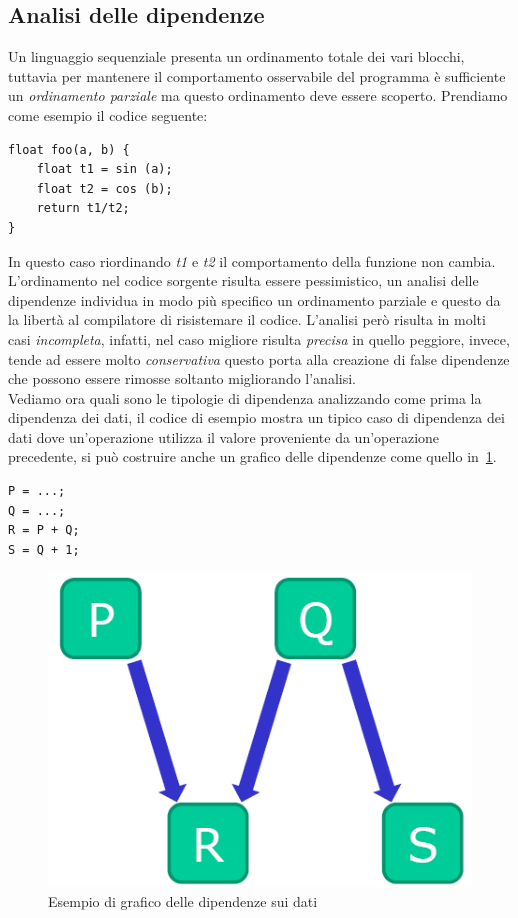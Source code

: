 \subsection{Analisi delle dipendenze}
Un linguaggio sequenziale presenta un ordinamento totale dei vari blocchi, tuttavia per mantenere il comportamento osservabile del programma è sufficiente un \emph{ordinamento parziale} ma questo ordinamento deve essere scoperto. Prendiamo come esempio il codice seguente:
\begin{verbatim}
float foo(a, b) {
    float t1 = sin (a);
    float t2 = cos (b);
    return t1/t2;
}
\end{verbatim}
In questo caso riordinando \emph{t1} e \emph{t2} il comportamento della funzione non cambia. L'ordinamento nel codice sorgente risulta essere pessimistico, un analisi delle dipendenze individua in modo più specifico un ordinamento parziale e questo da la libertà al compilatore di risistemare il codice. L'analisi però risulta in molti casi \emph{incompleta}, infatti, nel caso migliore risulta \emph{precisa} in quello peggiore, invece, tende ad essere molto \emph{conservativa} questo porta alla creazione di false dipendenze che possono essere rimosse soltanto migliorando l'analisi.\\
Vediamo ora quali sono le tipologie di dipendenza analizzando come prima la dipendenza dei dati, il codice di esempio mostra un tipico caso di dipendenza dei dati dove un'operazione utilizza il valore proveniente da un'operazione precedente, si può costruire anche un grafico delle dipendenze come quello in \figurename\,\ref{fig:datadep}.
\begin{verbatim}
P = ...;
Q = ...;
R = P + Q;
S = Q + 1;
\end{verbatim}
\begin{figure}
\centering
\includegraphics[scale=0.5]{img/datadep.png}
\caption{Esempio di grafico delle dipendenze sui dati}\label{fig:datadep}
\end{figure}
